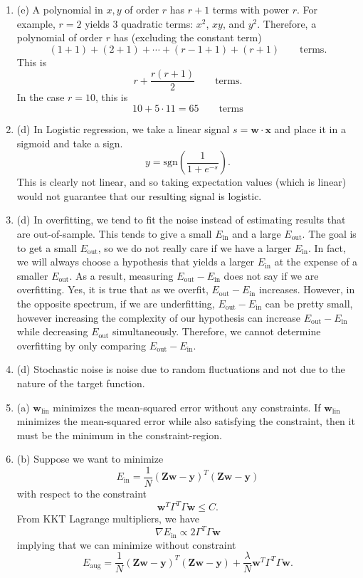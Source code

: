 \documentclass[12pt]{article}
\newcommand{\Ein}{E_{\text{in}}}
\newcommand{\Eout}{E_{\text{out}}}
\begin{document}
\begin{enumerate}[leftmargin=*]
\item (e) A polynomial in $x, y$ of order $r$ has $r + 1$ terms with power $r$. For example, $r = 2$ yields 3 quadratic terms: $x^2$, $xy$, and $y^2$. Therefore, a polynomial of order $r$ has (excluding the constant term)
\[ (1 + 1) + (2 + 1) + \cdots + (r - 1 + 1) + (r + 1) \qquad \text{terms}. \]
This is
\[ r + \frac{r ( r + 1)}{2} \qquad \text{terms}. \]
In the case $r = 10$, this is
\[ 10 + 5 \cdot 11 = 65 \qquad \text{terms} \]
\item (d) In Logistic regression, we take a linear signal $s = \mathbf w \cdot \mathbf x$ and place it in a sigmoid and take a sign.
\[ y = \text{sgn} \left( \frac{1}{1 + e^{-s}} \right). \]
This is clearly not linear, and so taking expectation values (which is linear) would not guarantee that our resulting signal is logistic.
\item (d) In overfitting, we tend to fit the noise instead of estimating results that are out-of-sample. This tends to give a small $\Ein$ and a large $\Eout$. The goal is to get a small $\Eout$, so we do not really care if we have a larger $\Ein$. In fact, we will always choose a hypothesis that yields a larger $\Ein$ at the expense of a smaller $\Eout$. As a result, measuring $\Eout - \Ein$ does not say if we are overfitting. Yes, it is true that as we overfit, $\Eout - \Ein$ increases. However, in the opposite spectrum, if we are underfitting, $\Eout - \Ein$ can be pretty small, however increasing the complexity of our hypothesis can increase $\Eout - \Ein$ while decreasing $\Eout$ simultaneously. Therefore, we cannot determine overfitting by only comparing $\Eout - \Ein$.
\item (d) Stochastic noise is noise due to random fluctuations and not due to the nature of the target function.
\item (a) $\mathbf w_{\text{lin}}$ minimizes the mean-squared error without any constraints. If $\mathbf w_{\text{lin}}$ minimizes the mean-squared error while also satisfying the constraint, then it must be the minimum in the constraint-region.
\item (b) Suppose we want to minimize
\[ \Ein = \frac{1}{N} (\mathbf Z \mathbf w - \mathbf y)^T (\mathbf Z \mathbf w - \mathbf y) \]
with respect to the constraint
\[ \mathbf w^T \Gamma^T \Gamma \mathbf w \leq C. \]
From KKT Lagrange multipliers, we have
\[ \nabla \Ein \propto 2 \Gamma^T \Gamma \mathbf w \]
implying that we can minimize without constraint
\[ E_{\text{aug}} = \frac{1}{N} (\mathbf Z \mathbf w - \mathbf y)^T (\mathbf Z \mathbf w - \mathbf y) + \frac{\lambda}{N} \mathbf w^T \Gamma^T \Gamma \mathbf w. \]

\end{enumerate}
\end{document}
